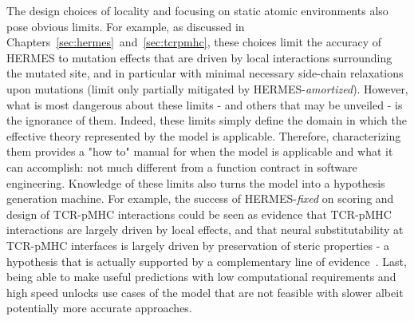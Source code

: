 The design choices of locality and focusing on static atomic environments also pose obvious limits.
For example, as discussed in Chapters~\ref{sec:hermes}~and~\ref{sec:tcrpmhc}, these choices limit the accuracy of HERMES to mutation effects
that are driven by local interactions surrounding the mutated site, and in particular with minimal necessary side-chain relaxations upon mutations
(limit only partially mitigated by HERMES-\textit{amortized}).
However, what is most dangerous about these limits - and others that may be unveiled - is the ignorance of them.
Indeed, these limits simply define the domain in which the effective theory represented by the model is applicable.
Therefore, characterizing them provides a "how to" manual for when the model is applicable and what it can accomplish:
not much different from a function contract in software engineering.
Knowledge of these limits also turns the model into a hypothesis generation machine. For example, the success of HERMES-\textit{fixed}
on scoring and design of TCR-pMHC interactions could be seen as evidence that TCR-pMHC interactions are largely driven by local effects,
and that neural substitutability at TCR-pMHC interfaces is largely driven by preservation of steric properties 
- a hypothesis that is actually supported by a complementary line of evidence~\citep{pyo_data-driven_2025}.
Last, being able to make useful predictions with low computational requirements and high speed unlocks use cases of the model that
are not feasible with slower albeit potentially more accurate approaches.

